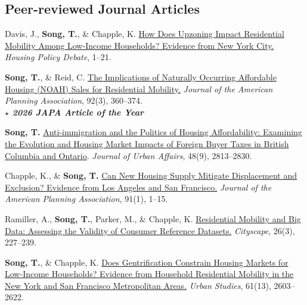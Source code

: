 \documentclass[11pt,letterpaper]{article}
\begin{document}
\subsection{Peer-reviewed Journal Articles}
\begin{tablist}
\item[2026] \tab{}Davis, J., \textbf{Song, T.}, \& Chapple, K. \href{https://doi.org/10.1080/10511482.2026.2649483}{How Does Upzoning Impact Residential Mobility Among Low-Income Households? Evidence from New York City.} \emph{Housing Policy Debate}, 1--21.
\item[2026] \tab{}\textbf{Song, T.}, \& Reid, C. \href{https://www.tandfonline.com/doi/full/10.1080/01944363.2026.2618647}{The Implications of Naturally Occurring Affordable Housing (NOAH) Sales for Residential Mobility.} \emph{Journal of the American Planning Association}, 92(3), 360--374.\\
  \textbf{\textit{$\star$ 2026 JAPA Article of the Year}}
\item[2026] \tab{}\textbf{Song, T.} \href{https://doi.org/10.1080/07352166.2025.2570754}{Anti-immigration and the Politics of Housing Affordability: Examining the Evolution and Housing Market Impacts of Foreign Buyer Taxes in British Columbia and Ontario}. \emph{Journal of Urban Affairs}, 48(9), 2813--2830.
  \item[2025] \tab{}Chapple, K., \& \textbf{Song, T.} \href{https://doi.org/10.1080/01944363.2024.2319293}{Can New Housing Supply Mitigate Displacement and Exclusion? Evidence from Los Angeles and San Francisco.} \emph{Journal of the American Planning Association}, 91(1), 1--15.
  \item[2024] \tab{}Ramiller, A., \textbf{Song, T.}, Parker, M., \& Chapple, K. \href{https://www.jstor.org/stable/48799257}{Residential Mobility and Big Data: Assessing the Validity of Consumer Reference Datasets.} \emph{Cityscape}, 26(3), 227--239.
  \item[2024] \tab{}\textbf{Song, T.}, \& Chapple, K. \href{https://doi.org/10.1177/00420980241244699}{Does Gentrification Constrain Housing Markets for Low-Income Households? Evidence from Household Residential Mobility in the New York and San Francisco Metropolitan Areas.} \emph{Urban Studies}, 61(13), 2603--2622.

\end{tablist}
\end{document}
